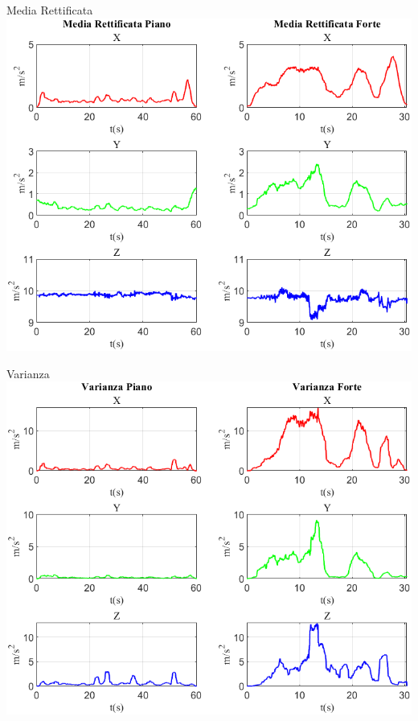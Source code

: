 \documentclass[beamer]{standalone}
\begin{document}
	\begin{frame}{{Media Rettificata}}
		\centering\includegraphics[height=.8\textheight]{figure/Acc/Media Rettificata}
	\end{frame}
	
	\begin{frame}{{Varianza}}
		\centering\includegraphics[height=.8\textheight]{figure/Acc/Varianza}
	\end{frame}
	
\end{document}
